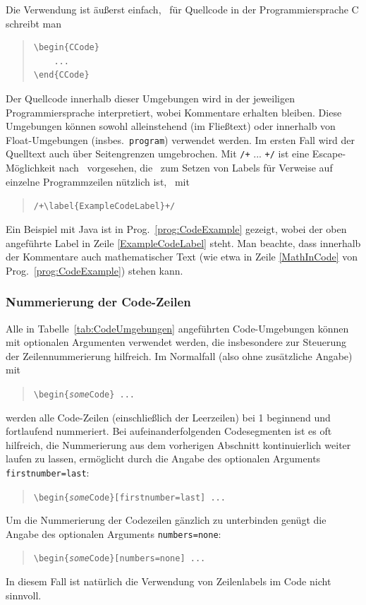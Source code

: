 %
Die Verwendung ist äußerst einfach, \zB\ für Quellcode in der Programmiersprache C schreibt man
%
\begin{quote}
\begin{verbatim}
\begin{CCode}
    ... 
\end{CCode}
\end{verbatim}
\end{quote}
%
Der Quellcode innerhalb dieser Umgebungen wird in der jeweiligen Programmiersprache interpretiert, wobei Kommentare erhalten bleiben. Diese Umgebungen können sowohl alleinstehend (im Fließtext) oder innerhalb von Float-Umgebungen (insbes.\ \texttt{program}) verwendet werden. Im ersten Fall wird der Quelltext auch über Seitengrenzen umgebrochen. Mit \verb!/+! ... \verb!+/! ist eine Escape-Möglichkeit nach \latex\ vorgesehen, die \va\ zum Setzen von Labels für Verweise auf einzelne Programmzeilen nützlich ist, \zB\ mit
%
\begin{quote}
\verb!/+\label{ExampleCodeLabel}+/!
\end{quote}
%
Ein Beispiel mit Java ist in Prog.~\ref{prog:CodeExample} gezeigt, wobei der oben angeführte Label in Zeile \ref{ExampleCodeLabel} steht.
Man beachte, dass innerhalb der Kommentare auch mathematischer Text (wie etwa in Zeile \ref{MathInCode} von Prog.~\ref{prog:CodeExample}) stehen kann.


\subsubsection{Nummerierung der Code-Zeilen}

Alle in Tabelle~\ref{tab:CodeUmgebungen} angeführten Code-Umgebungen können
mit optionalen Argumenten verwendet werden, die insbesondere zur Steuerung der
Zeilennummerierung hilfreich. 
Im Normalfall (also ohne zusätzliche Angabe) mit
%
\begin{quote}
\verb!\begin{!\texttt{\emph{some}Code}\verb!} ... !
\end{quote}
%
werden alle Code-Zeilen (einschließlich der Leerzeilen) bei 1 beginnend und 
fortlaufend nummeriert.
%
Bei aufeinanderfolgenden Codesegmenten ist es oft hilfreich, die Nummerierung 
aus dem vorherigen Abschnitt kontinuierlich weiter laufen zu lassen,
ermöglicht durch die Angabe des optionalen Arguments 
\texttt{firstnumber={\optbreaknh}last}:
%
\begin{quote}
\verb!\begin{!\texttt{\emph{some}Code}\verb!}[firstnumber=last] ... !
\end{quote}
%
Um die Nummerierung der Codezeilen gänzlich zu unterbinden genügt die Angabe
des optionalen Arguments
\texttt{numbers={\optbreaknh}none}:
%
\begin{quote}
\verb!\begin{!\texttt{\emph{some}Code}\verb!}[numbers=none] ... !
\end{quote}
%
In diesem Fall ist natürlich die Verwendung von Zeilenlabels im Code nicht
sinnvoll.



